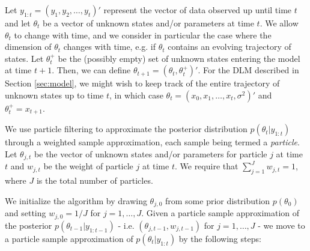 \documentclass{article}
\begin{document}
Let $y_{1:t} = (y_1,y_2,\ldots,y_t)'$ represent the vector of data observed up until time $t$ and let $\theta_t$ be a vector of unknown states and/or parameters at time $t$. We allow $\theta_t$ to change with time, and we consider in particular the case where the dimension of $\theta_t$ changes with time, e.g. if $\theta_t$ contains an evolving trajectory of states. Let $\theta^{+}_t$ be the (possibly empty) set of unknown states entering the model at time $t+1$. Then, we can define $\theta_{t+1} = (\theta_t,\theta^{+}_t)'$. For the DLM described in Section \ref{sec:model}, we might wish to keep track of the entire trajectory of unknown states up to time $t$, in which case $\theta_t = (x_0,x_1,\ldots,x_t,\sigma^2)'$ and $\theta^{+}_t = x_{t+1}$.

We use particle filtering to approximate the posterior distribution $p(\theta_t|y_{1:t})$ through a weighted sample approximation, each sample being termed a \emph{particle}. Let $\theta_{j,t}$ be the vector of unknown states and/or parameters for particle $j$ at time $t$ and $w_{j,t}$ be the weight of particle $j$ at time $t$. We require that $\sum_{j=1}^J w_{j,t} = 1$, where $J$ is the total number of particles.

We initialize the algorithm by drawing $\theta_{j,0}$ from some prior distribution $p(\theta_0)$ and setting $w_{j,0} = 1 / J$ for $j = 1,\ldots,J$. Given a particle sample approximation of the posterior $p(\theta_{t-1}|y_{1:t-1})$ - i.e. $\left(\theta_{j,t-1}, w_{j,t-1}\right)$ for $j=1,\ldots,J$ - we move to a particle sample approximation of $p(\theta_t|y_{1:t})$ by the following steps:
\end{document}
